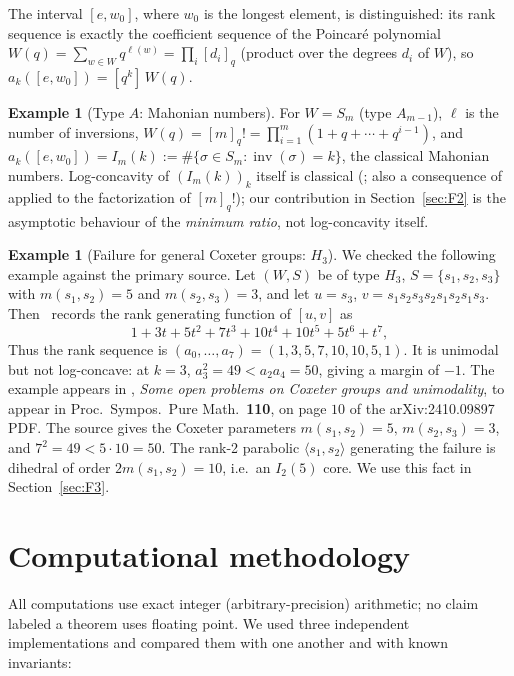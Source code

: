 \documentclass[11pt]{amsart}
\theoremstyle{plain}
\theoremstyle{definition}
\newtheorem{example}[theorem]{Example}
\theoremstyle{remark}
\newcommand{\W}{W}
\DeclareMathOperator{\inv}{inv}
\begin{document}
The interval $[e,w_0]$, where $w_0$ is the longest element, is distinguished:
its rank sequence is exactly the coefficient sequence of the Poincar\'e
polynomial $W(q) = \sum_{w\in \W} q^{\ell(w)} = \prod_{i} [d_i]_q$ (product
over the degrees $d_i$ of $\W$), so $a_k([e,w_0]) = [q^k]\,W(q)$.

\begin{example}[Type $A$: Mahonian numbers]
For $\W=S_m$ (type $A_{m-1}$), $\ell$ is the number of inversions,
$W(q)=[m]_q! = \prod_{i=1}^m (1+q+\cdots+q^{i-1})$, and $a_k([e,w_0]) =
I_m(k) := \#\{\sigma\in S_m : \inv(\sigma)=k\}$, the classical Mahonian
numbers. Log-concavity of $(I_m(k))_k$ itself is classical
(\cite{bona2004}; also a consequence of~\cite{hoggar1974,kook2006} applied to
the factorization of $[m]_q!$); our contribution in Section~\ref{sec:F2} is
the asymptotic behaviour of the \emph{minimum ratio}, not log-concavity
itself.
\end{example}

\begin{example}[Failure for general Coxeter groups: $H_3$]
\label{ex:H3}
We checked the following example against the primary source. Let $(W,S)$ be of type $H_3$, $S=\{s_1,s_2,s_3\}$ with
$m(s_1,s_2)=5$ and $m(s_2,s_3)=3$, and let $u=s_3$,
$v=s_1s_2s_3s_2s_1s_2s_1s_3$. Then~\cite[Conjecture~2.11]{brenti2024open}
records the rank generating function of $[u,v]$ as
\[
1+3t+5t^2+7t^3+10t^4+10t^5+5t^6+t^7,
\]
Thus the rank sequence is
$(a_0,\dots,a_7)=(1,3,5,7,10,10,5,1)$. It is unimodal but not
log-concave: at $k=3$, $a_3^2=49 < a_2a_4=50$, giving a margin of $-1$.
The example appears in \cite[Conjecture~2.11]{brenti2024open},
\emph{Some open problems on Coxeter groups and unimodality}, to appear in
Proc.\ Sympos.\ Pure Math.\ \textbf{110}, on page $10$ of the
arXiv:2410.09897 PDF. The source gives the Coxeter parameters
$m(s_1,s_2)=5,\,m(s_2,s_3)=3$, and $7^2=49<5\cdot10=50$. The rank-2
parabolic $\langle s_1,s_2\rangle$ generating the failure is dihedral of
order $2m(s_1,s_2)=10$, i.e.\ an $I_2(5)$ core. We use this fact in
Section~\ref{sec:F3}.
\end{example}

\section{Computational methodology}
\label{sec:methods}

All computations use exact integer (arbitrary-precision) arithmetic; no
claim labeled a theorem uses floating point. We used three independent
implementations and compared them with one another and with known
invariants:
\end{document}
